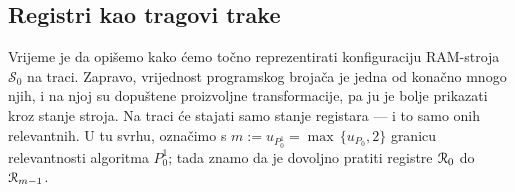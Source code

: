 
\subsection{Registri kao tragovi trake}

Vrijeme je da opišemo kako ćemo točno reprezentirati konfiguraciju RAM-stroja $\mathcal S_0$ na traci.  Zapravo, vrijednost programskog brojača je jedna od konačno mnogo njih, i na njoj su dopuštene proizvoljne transformacije, pa ju je bolje prikazati kroz stanje stroja. Na traci će stajati samo stanje registara --- i to samo onih relevantnih. U tu svrhu, označimo s $m:=u_{P_0^1}=\max\,\{u_{P_0},2\}$ granicu relevantnosti algoritma $P_0^1$; tada znamo da je dovoljno pratiti registre $\mathcal R_{0}$ do $\mathcal R_{m-1}$.

